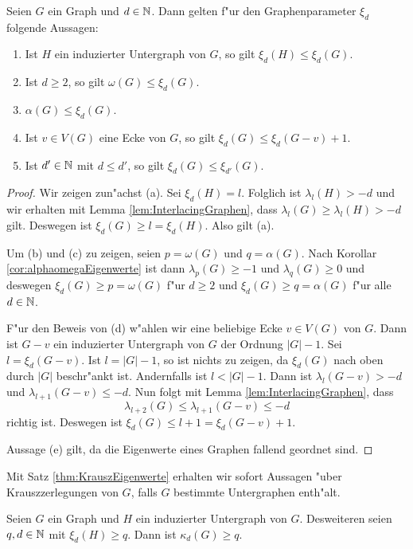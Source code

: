 \begin{lemma}
  Seien $G$ ein Graph und $d\in {\mathbb{N}}$. Dann gelten f"ur den Graphenparameter $\xi_d$ folgende Aussagen:
  \begin{enumerate}[label={\rm(\alph*)}]
    \item Ist $H$ ein induzierter Untergraph von $G$, so gilt $\xi_{d}(H) \leq \xi_{d}(G)$.
    \item Ist $d\geq 2$, so gilt $\omega(G) \leq \xi_{d}(G)$.
    \item $\alpha(G) \leq \xi_{d}(G)$. 
    \item Ist $v\in V(G)$ eine Ecke von $G$, so gilt $\xi_{d}(G) \leq \xi_{d}(G-v) +1$.
    \item Ist $d'\in{\mathbb{N}}$ mit $d \leq d'$, so gilt $\xi_{d}(G) \leq \xi_{d'}(G)$.
  \end{enumerate}
  \label{lem:xieigenschaften}
\end{lemma}

\begin{proof}
  Wir zeigen zun"achst (a). Sei $\xi_{d}(H) = l$. Folglich ist $\lambda_{l}(H) > -d$ und wir erhalten mit Lemma \ref{lem:InterlacingGraphen}, dass $\lambda_{l}(G) \geq \lambda_{l}(H) > -d$ gilt. Deswegen ist $\xi_{d}(G) \geq l = \xi_{d}(H)$. Also gilt (a).

  Um (b) und (c) zu zeigen, seien $p = \omega(G)$ und $q=\alpha(G)$. Nach Korollar \ref{cor:alphaomegaEigenwerte} ist dann $\lambda_{p}(G) \geq -1$ und $\lambda_q(G) \geq 0$ und deswegen $\xi_{d}(G) \geq p = \omega(G)$ f"ur $d \geq 2$ und $\xi_{d}(G) \geq q = \alpha(G)$ f"ur alle $d \in {\mathbb{N}}$. 

  F"ur den Beweis von (d) w"ahlen wir eine beliebige Ecke $v\in V(G)$ von $G$. Dann ist $G-v$ ein induzierter Untergraph von $G$ der Ordnung $|G|-1$. Sei $l=\xi_{d}(G-v)$. Ist $l= |G|-1$, so ist nichts zu zeigen, da $\xi_d(G)$ nach oben durch $|G|$ beschr"ankt ist. Andernfalls ist $l< |G| -1$. 
  Dann ist $\lambda_{l}(G-v) > -d$ und $\lambda_{l+1}(G-v) \leq -d$. Nun folgt mit Lemma \ref{lem:InterlacingGraphen}, dass $$\lambda_{l+2}(G) \leq \lambda_{l+1}(G-v) \leq -d$$ richtig ist. Deswegen ist $\xi_{d}(G) \leq l+1 = \xi_{d}(G-v) +1$. 

  Aussage (e) gilt, da die Eigenwerte eines Graphen fallend geordnet sind.
\end{proof}

Mit Satz \ref{thm:KrauszEigenwerte} erhalten wir sofort Aussagen "uber Krauszzerlegungen von $G$, falls $G$ bestimmte Untergraphen enth"alt.
\begin{corollary}
  \label{cor:Korollar1}
  Seien $G$ ein Graph und $H$ ein induzierter Untergraph von $G$. Desweiteren seien $q,d \in {\mathbb{N}}$ mit $\xi_{d}(H) \geq q$. Dann ist $\kappa_{d}(G) \geq q$.
\end{corollary}

